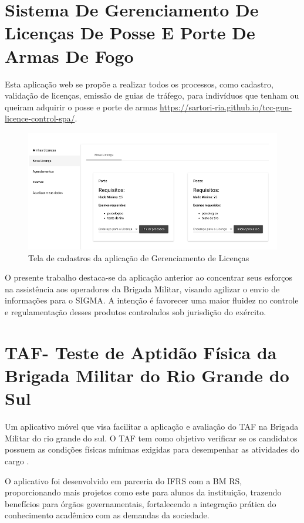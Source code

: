 \section{Sistema De Gerenciamento De Licenças De Posse E Porte De Armas De Fogo}
Esta aplicação web se propõe a realizar todos os processos, como cadastro, validação de licenças, emissão de guias de tráfego, para indivíduos que tenham ou queiram adquirir o posse e porte de armas
\url{https://sartori-ria.github.io/tcc-gun-licence-control-spa/}.
\begin{figure}[htb]
    \caption{\label{fig:grafico-sglppa} Tela de cadastros da aplicação de Gerenciamento de Licenças}
    \begin{center}
        \includegraphics[scale=0.8]{imagens/sglppa.png}
    \end{center}
\end{figure}

O presente trabalho destaca-se da aplicação anterior ao concentrar seus esforços na assistência aos operadores da Brigada Militar, visando agilizar o envio de informações para o SIGMA. A intenção é favorecer uma maior fluidez no controle e regulamentação desses produtos controlados sob jurisdição do exército.

\section{TAF- Teste de Aptidão Física da Brigada Militar do Rio Grande do Sul}
Um aplicativo móvel que visa facilitar a aplicação e avaliação do TAF na Brigada Militar do rio grande do sul. 
O TAF tem como objetivo verificar se os candidatos possuem as condições físicas mínimas exigidas para desempenhar as atividades do cargo \cite{taf}.

O aplicativo foi desenvolvido em parceria do IFRS com a BM RS, proporcionando mais projetos como este para alunos da instituição, trazendo benefícios para órgãos governamentais, fortalecendo a integração prática do conhecimento acadêmico com as demandas da sociedade.

